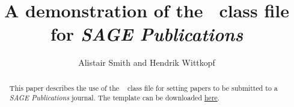 

\newcommand\BibTeX{{\rmfamily B\kern-.05em \textsc{i\kern-.025em b}\kern-.08em
T\kern-.1667em\lower.7ex\hbox{E}\kern-.125emX}}

\def\volumeyear{2018}


\title{A demonstration of the \LaTeXe\ class file for 
\itshape{SAGE Publications}}

\author{Alistair Smith and Hendrik Wittkopf}




\begin{abstract}
This paper describes the use of the \LaTeXe\ \textsf{\journalclass} class file 
for setting papers to be submitted to a \textit{SAGE Publications} journal. The 
template can be downloaded 
\href{http://www.uk.sagepub.com/repository/binaries/SAGE LaTeX template.zip}{here}.
\end{abstract}


\maketitle
